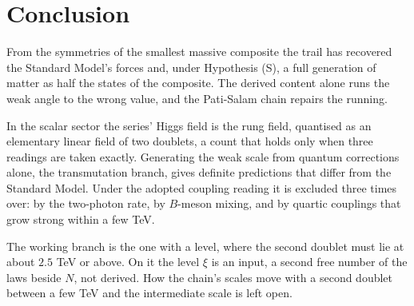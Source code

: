 \documentclass[11pt]{article}
\theoremstyle{definition}
\theoremstyle{plain}
\begin{document}
\section*{Conclusion}
From the symmetries of the smallest massive composite the trail has recovered the Standard Model's forces and, under Hypothesis (S), a full generation of matter as half the states of the composite. The derived content alone runs the weak angle to the wrong value, and the Pati-Salam chain repairs the running.

In the scalar sector the series' Higgs field is the rung field, quantised as an elementary linear field of two doublets, a count that holds only when three readings are taken exactly. Generating the weak scale from quantum corrections alone, the transmutation branch, gives definite predictions that differ from the Standard Model. Under the adopted coupling reading it is excluded three times over: by the two-photon rate, by $B$-meson mixing, and by quartic couplings that grow strong within a few TeV.

The working branch is the one with a level, where the second doublet must lie at about $2.5$ TeV or above. On it the level $\xi$ is an input, a second free number of the laws beside $N$, not derived. How the chain's scales move with a second doublet between a few TeV and the intermediate scale is left open.
\end{document}
